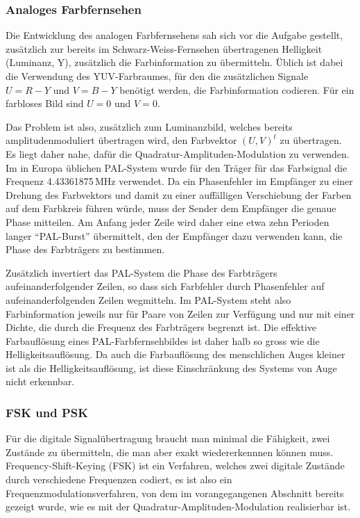 \subsubsection{Analoges Farbfernsehen}
Die Entwicklung des analogen Farbfernsehens sah sich vor die Aufgabe 
gestellt, zusätzlich zur bereits im Schwarz-Weiss-Fernsehen übertragenen
Helligkeit (Luminanz, Y), zusätzlich die Farbinformation zu übermitteln.
Üblich ist dabei die Verwendung des YUV-Farbraumes, für den die zusätzlichen
Signale $U=R-Y$ und $V=B-Y$ benötigt werden, die Farbinformation codieren.
Für ein farbloses Bild sind $U=0$ und $V=0$.

Das Problem ist also, zusätzlich zum Luminanzbild, welches bereits
amplitudenmoduliert übertragen wird, den Farbvektor $(U,V)^t$ zu
übertragen.
Es liegt daher nahe, dafür die Quadratur-Amplituden-Modulation zu
verwenden.
Im in Europa üblichen PAL-System wurde für den Träger für das Farbsignal
die Frequenz 4.43361875\,MHz verwendet.
Da ein Phasenfehler im Empfänger zu einer Drehung des Farbvektors
und damit zu einer auffälligen Verschiebung der Farben auf dem Farbkreis
führen würde, muss der Sender dem Empfänger die genaue Phase mitteilen.
Am Anfang jeder Zeile wird daher eine etwa zehn Perioden langer ``PAL-Burst''
übermittelt, den der Empfänger dazu verwenden kann, die Phase des
Farbträgers zu bestimmen.

Zusätzlich invertiert das PAL-System die Phase des Farbträgers
aufeinanderfolgender Zeilen, so dass sich Farbfehler durch Phasenfehler
auf aufeinanderfolgenden Zeilen wegmitteln.
Im PAL-System steht also Farbinformation jeweils nur für Paare von Zeilen
zur Verfügung und nur mit einer Dichte, die durch die Frequenz des Farbträgers
begrenzt ist.
Die effektive Farbauflösung eines PAL-Farbfernsehbildes ist daher halb so
gross wie die Helligkeitsauflösung.
Da auch die Farbauflösung des menschlichen Auges kleiner ist als die
Helligkeitsauflösung, ist diese Einschränkung des Systems von Auge nicht 
erkennbar.

\subsubsection{FSK und PSK}
Für die digitale Signalübertragung braucht man minimal die Fähigkeit,
zwei Zustände zu übermitteln, die man aber exakt wiedererkennnen können muss.
Frequency-Shift-Keying (FSK) ist ein Verfahren, welches zwei digitale Zustände
durch verschiedene Frequenzen codiert, es ist also ein
Frequenzmodulationsverfahren, von dem im vorangegangenen Abschnitt
bereits gezeigt wurde, wie es mit der Quadratur-Amplituden-Modulation
realisierbar ist.

